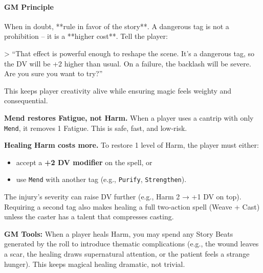 \begin{tcolorbox}
\paragraph{GM Principle}
When in doubt, **rule in favor of the story**. A dangerous tag is not a prohibition – it is a **higher cost**. Tell the player:

> “That effect is powerful enough to reshape the scene. It’s a dangerous tag, so the DV will be +2 higher than usual. On a failure, the backlash will be severe. Are you sure you want to try?”

This keeps player creativity alive while ensuring magic feels weighty and consequential.

\textbf{Mend restores Fatigue, not Harm.} When a player uses a cantrip with only \texttt{Mend}, it removes 1 Fatigue. This is safe, fast, and low‑risk.

\textbf{Healing Harm costs more.} To restore 1 level of Harm, the player must either:
\begin{itemize}
  \item accept a \textbf{+2 DV modifier} on the spell, or
  \item use \texttt{Mend} with another tag (e.g., \texttt{Purify}, \texttt{Strengthen}).
\end{itemize}
The injury’s severity can raise DV further (e.g., Harm 2 → +1 DV on top). Requiring a second tag also makes healing a full two‑action spell (Weave + Cast) unless the caster has a talent that compresses casting.

\textbf{GM Tools:} When a player heals Harm, you may spend any Story Beats generated by the roll to introduce thematic complications (e.g., the wound leaves a scar, the healing draws supernatural attention, or the patient feels a strange hunger). This keeps magical healing dramatic, not trivial.

\end{tcolorbox}


